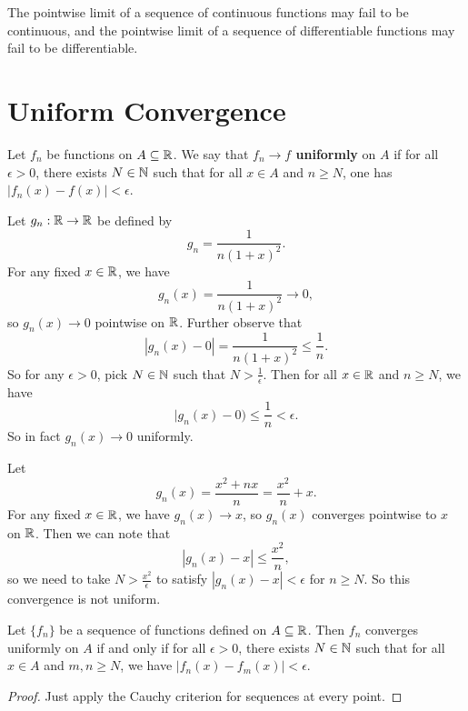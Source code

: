 \begin{remark}
  The pointwise limit of a sequence of
  continuous functions may fail to be continuous, and
  the pointwise limit of a sequence of
  differentiable functions may fail to be differentiable.
\end{remark}

\section{Uniform Convergence}
\begin{definition}
  Let $f_n$ be functions on $A \subseteq \mathbb{R}$. We say that
  \textbf{$f_n \to f$ uniformly} on $A$ if for all
  $\epsilon > 0$, there exists $N \in \mathbb{N}$ such that
  for all $x \in A$ and $n \ge N$, one has
  $|f_n(x) - f(x)| < \epsilon$.
\end{definition}

\begin{example}
  Let $g_n : \mathbb{R} \to \mathbb{R}$ be defined by
  \[g_n = \frac{1}{n(1 + x)^2}.\]
  For any fixed $x \in \mathbb{R}$, we have
  \[g_n(x) = \frac{1}{n(1 + x)^2} \to 0,\]
  so $g_n(x) \to 0$ pointwise on $\mathbb{R}$. Further observe that
  \[
    |g_n(x) - 0| = \frac{1}{n(1 + x)^2} \le \frac{1}{n}.
  \]
  So for any $\epsilon > 0$, pick $N \in \mathbb{N}$
  such that $N > \frac{1}{\epsilon}$. Then for all
  $x \in \mathbb{R}$ and $n \ge N$, we have
  \[|g_n(x) - 0) \le \frac{1}{n} < \epsilon.\]
  So in fact $g_n(x) \to 0$ uniformly.
\end{example}

\begin{example}
  Let
  \[g_n(x) = \frac{x^2 + nx}{n} = \frac{x^2}{n} + x.\]
  For any fixed $x \in \mathbb{R}$, we have $g_n(x) \to x$,
  so $g_n(x)$ converges pointwise to $x$ on $\mathbb{R}$.
  Then we can note that
  \[|g_n(x) - x| \le \frac{x^2}{n},\]
  so we need to take $N > \frac{x^2}{\epsilon}$ to satisfy
  $|g_n(x) - x| < \epsilon$ for $n \ge N$. So
  this convergence is not uniform.
\end{example}

\begin{theorem}
  Let $\{f_n\}$ be a sequence of functions defined
  on $A \subseteq \mathbb{R}$. Then $f_n$ converges uniformly
  on $A$ if and only if for all $\epsilon > 0$,
  there exists $N \in \mathbb{N}$ such that for all $x \in A$
  and $m, n \ge N$, we have
  $|f_n(x) - f_m(x)| < \epsilon$.
\end{theorem}

\begin{proof}
  Just apply the Cauchy criterion for sequences at every
  point.
\end{proof}


